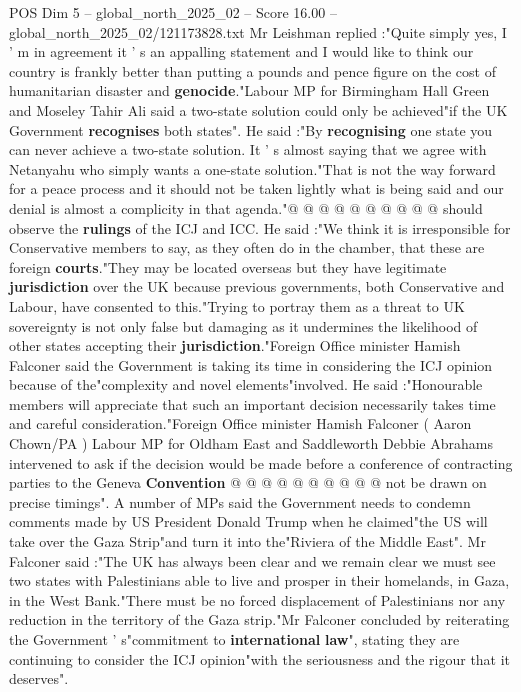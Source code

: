 \begin{textsample}{POS Dim 5 – global\_north\_2025\_02 – Score 16.00 – global\_north\_2025\_02/121173828.txt}
Mr Leishman replied :"Quite simply yes, I ' m in agreement it ' s an appalling statement and I would like to think our country is frankly better than putting a pounds and pence figure on the cost of humanitarian disaster and \textbf{genocide}."Labour MP for Birmingham Hall Green and Moseley Tahir Ali said a two-state solution could only be achieved"if the UK Government \textbf{recognises} both states".
He said :"By \textbf{recognising} one state you can never achieve a two-state solution.
It ' s almost saying that we agree with Netanyahu who simply wants a one-state solution."That is not the way forward for a peace process and it should not be taken lightly what is being said and our denial is almost a complicity in that agenda."@ @ @ @ @ @ @ @ @ @ should observe the \textbf{rulings} of the ICJ and ICC.
He said :"We think it is irresponsible for Conservative members to say, as they often do in the chamber, that these are foreign \textbf{courts}."They may be located overseas but they have legitimate \textbf{jurisdiction} over the UK because previous governments, both Conservative and Labour, have consented to this."Trying to portray them as a threat to UK sovereignty is not only false but damaging as it undermines the likelihood of other states accepting their \textbf{jurisdiction}."Foreign Office minister Hamish Falconer said the Government is taking its time in considering the ICJ opinion because of the"complexity and novel elements"involved.
He said :"Honourable members will appreciate that such an important decision necessarily takes time and careful consideration."Foreign Office minister Hamish Falconer ( Aaron Chown/PA ) Labour MP for Oldham East and Saddleworth Debbie Abrahams intervened to ask if the decision would be made before a conference of contracting parties to the Geneva \textbf{Convention} @ @ @ @ @ @ @ @ @ @ not be drawn on precise timings".
A number of MPs said the Government needs to condemn comments made by US President Donald Trump when he claimed"the US will take over the Gaza Strip"and turn it into the"Riviera of the Middle East".
Mr Falconer said :"The UK has always been clear and we remain clear we must see two states with Palestinians able to live and prosper in their homelands, in Gaza, in the West Bank."There must be no forced displacement of Palestinians nor any reduction in the territory of the Gaza strip."Mr Falconer concluded by reiterating the Government ' s"commitment to \textbf{international} \textbf{law}", stating they are continuing to consider the ICJ opinion"with the seriousness and the rigour that it deserves".

\end{textsample}
